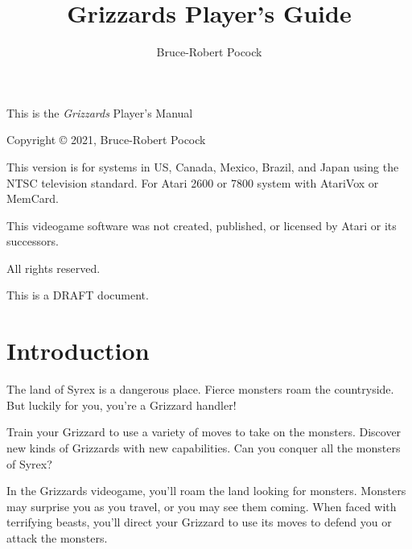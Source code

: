 \documentclass[12pt,twoside,openright,book]{memoir}
\title{Grizzards Player's Guide}
\author{Bruce-Robert Pocock}
\makeatletter
\newcommand\TV{NTSC}
\newcommand\REGION{US, Canada, Mexico, Brazil, and Japan}
\newcommand\TV{PAL}
\newcommand\REGION{UK and Europe (except France)}
\newcommand\TV{SECAM}
\newcommand\REGION{France, Russia, Africa}
\def\maketitle{%
  \null
  \thispagestyle{empty}%
  \vfill
  \begin{center}\leavevmode
    \normalfont
    {\LARGE\raggedleft \@author\par}%
    \hrulefill\par
    {\huge\raggedright \@title\par}%
    \vskip 1cm
  \end{center}%
  \vfill
  \null
  \cleardoublepage
  }
\makeatother
\begin{document}


\maketitle

\frontmatter

\null\vfill

\begin{flushleft}
This is the \textit{Grizzards} Player's Manual

Copyright \copyright{} 2021, Bruce-Robert Pocock

\bigskip

This version is for systems in \REGION{} using the \TV{} television
standard. For Atari 2600 or 7800 system with AtariVox or MemCard.

\bigskip

This videogame software was not created, published, or licensed by Atari
or its successors.

\bigskip

\thedate

\bigskip

All rights reserved.

\bigskip

This is a DRAFT document.

\end{flushleft}
\let\cleardoublepage\clearpage

\mainmatter

\chapter{Introduction}\label{Introduction}

The  land of  Syrex  is  a dangerous  place.  Fierce  monsters roam  the
countryside. But luckily for you, you're a Grizzard handler!

Train your Grizzard to  use a variety of moves to  take on the monsters.
Discover new kinds  of Grizzards with new capabilities.  Can you conquer
all the monsters of Syrex?

In the Grizzards  videogame, you'll roam the land  looking for monsters.
Monsters may  surprise you as  you travel, or  you may see  them coming.
When faced  with terrifying beasts,  you'll direct your Grizzard  to use
its moves to defend you or attack the monsters.

\cleardoublepage

\tableofcontents
\end{document}

